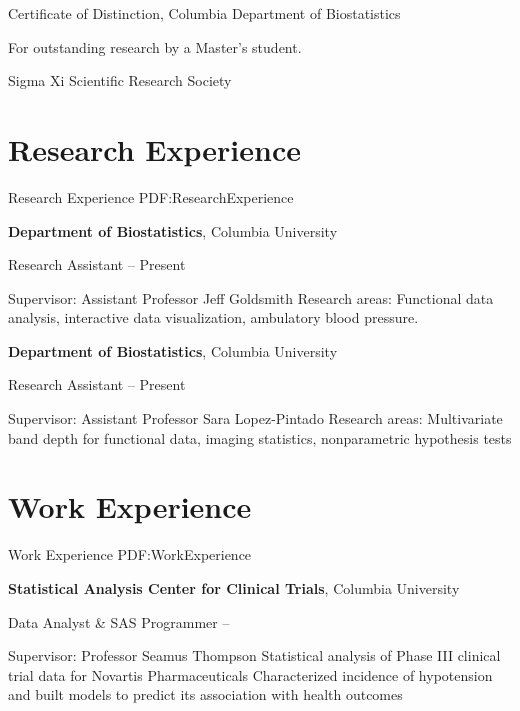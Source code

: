 \documentclass[a4paper,10pt,oneside]{article}
\begin{document}
\begin{body}
Certificate of Distinction,
Columbia Department of Biostatistics
\hfill
{}
\begin{detail}
For outstanding research by a Master's student.
\end{detail}

\EntryGap
Sigma Xi Scientific Research Society
\hfill
{}



\section
{Research \newline 
Experience}
{Research Experience}
{PDF:ResearchExperience}

\textbf{Department of Biostatistics},
Columbia University
\par
Research Assistant
\hfill
{} --
Present
\begin{detail}
\BulletItem
Supervisor:
Assistant Professor Jeff Goldsmith
\BulletItem
Research areas:
Functional data analysis, interactive data visualization, ambulatory blood pressure.
\end{detail}

\EntryGap
\textbf{Department of Biostatistics},
Columbia University
\par
Research Assistant
\hfill
{} --
Present
\begin{detail}
\BulletItem
Supervisor:
Assistant Professor Sara Lopez-Pintado
\BulletItem
Research areas:
Multivariate band depth for functional data, imaging statistics, nonparametric hypothesis tests
\end{detail}


\section
{Work\newline
Experience}
{Work Experience}
{PDF:WorkExperience}

\textbf{Statistical Analysis Center for Clinical Trials},
Columbia University
\par
Data Analyst \& SAS Programmer
\hfill
{} --
\begin{detail}
\BulletItem
Supervisor:
Professor Seamus Thompson
\BulletItem
Statistical analysis of Phase III clinical trial data for Novartis Pharmaceuticals
\BulletItem
Characterized incidence of hypotension and built models to predict its association with health outcomes 


\end{detail}
\end{body}
\end{document}
